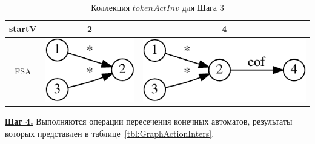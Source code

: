 \documentclass[10pt, conference, compsocconf]{IEEEtran}
\begin{document}
\begin{table}[t]
  \vspace{2 mm}
  \begin{tabular}{ | c | c | c | }
  \hline
    startV & 2 & 4 \\ \hline
    FSA
    &
    \begin{minipage}{.15\textwidth}
    \vspace{1 mm}
      \includegraphics[width=0.7\linewidth]{pics/35_inv}
    \end{minipage}
    & 
    \begin{minipage}{.15\textwidth}
    \vspace{1 mm} 
      \includegraphics[width=\linewidth]{pics/49_inv}
    \end{minipage}    
    \\ \hline
  \end{tabular}
  \caption{Коллекция $tokenActInv$ для Шага 3}
  \label{tbl:GraphActionInv}
\end{table}

\textbf{\underline{Шаг 4.}} Выполняются операции пересечения конечных автоматов, результаты которых представлен в таблице~\ref{tbl:GraphActionInters}.
\end{document}
